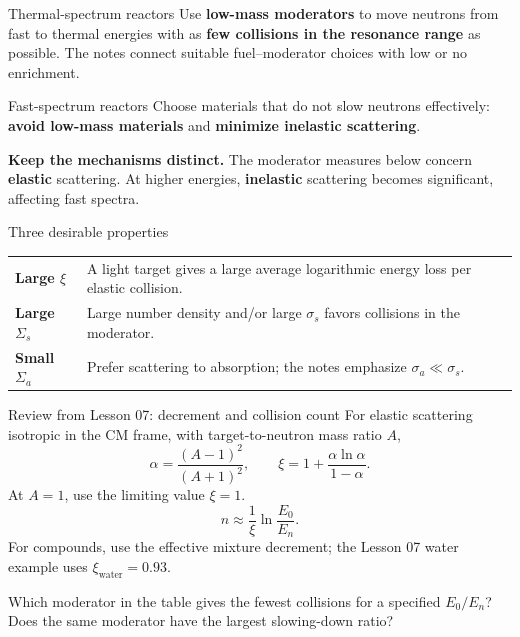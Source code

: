 \begin{handoutcolumns}
\begin{fixedbox}{Thermal-spectrum reactors}
Use \textbf{low-mass moderators} to move neutrons from fast to thermal
energies with as \textbf{few collisions in the resonance range} as possible.
The notes connect suitable fuel--moderator choices with low or no enrichment.
\end{fixedbox}

\begin{fixedbox}{Fast-spectrum reactors}
Choose materials that do not slow neutrons effectively:
\textbf{avoid low-mass materials} and \textbf{minimize inelastic scattering}.
\end{fixedbox}

\textbf{Keep the mechanisms distinct.} The moderator measures below concern
\textbf{elastic} scattering. At higher energies, \textbf{inelastic}
scattering becomes significant, affecting fast spectra.

\begin{fixedbox}{Three desirable properties}
\renewcommand{\arraystretch}{1.16}
\begin{tabularx}{\linewidth}{@{}l >{\raggedright\arraybackslash}X@{}}
\textbf{Large $\xi$} & A light target gives a large average logarithmic energy loss per elastic collision.\\
\textbf{Large $\Sigma_s$} & Large number density and/or large $\sigma_s$ favors collisions in the moderator.\\
\textbf{Small $\Sigma_a$} & Prefer scattering to absorption; the notes emphasize $\sigma_a\ll\sigma_s$.
\end{tabularx}
\end{fixedbox}

\begin{fixedbox}{Review from Lesson 07: decrement and collision count}
For elastic scattering isotropic in the CM frame, with target-to-neutron
mass ratio $A$,
$$
\alpha=\frac{(A-1)^2}{(A+1)^2},\qquad
\xi=1+\frac{\alpha\ln\alpha}{1-\alpha}.
$$
At $A=1$, use the limiting value $\xi=1$.
$$
n\approx\frac{1}{\xi}\ln\frac{E_0}{E_n}.
$$
For compounds, use the effective mixture decrement; the Lesson 07
water example uses $\xi_{\mathrm{water}}=0.93$.
\end{fixedbox}

\begin{checkpoint}
Which moderator in the table gives the fewest collisions for a specified
$E_0/E_n$? Does the same moderator have the largest slowing-down ratio?
\end{checkpoint}


\end{handoutcolumns}
